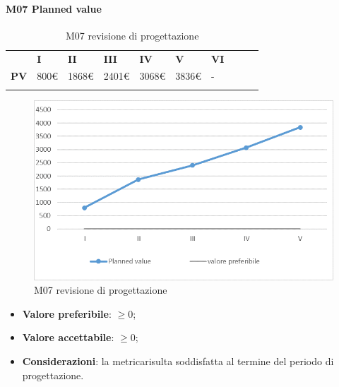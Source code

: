 \paragraph{M07 Planned value} \mbox{}
\begin{longtable}[H!] {						
		>{}p{38mm}  		
		>{}p{12mm}
		>{}p{12mm}		
		>{}p{12mm}		
		>{}p{12mm}		
		>{}p{12mm}		
		>{}p{12mm}
		>{}p{12mm}
		>{}p{12mm}
		>{}p{12mm}
	}
	\rowcolor{gray!50}
	\textbf{} & \textbf{I} & \textbf{II} & \textbf{III} & \textbf{IV} & \textbf{V} & \textbf{VI} \TBstrut \\ [2mm]
	\textbf{PV} & 800\euro & 1868\euro & 2401\euro & 3068\euro & 3836\euro & - \TBstrut \\ [2mm]
	\rowcolor{white}
	\caption{M07 revisione di progettazione\glo}
\end{longtable}
\begin{figure}[H] 	
\includegraphics[width=\linewidth]{./img/grafici/RP4.png}	
\caption{M07 revisione di progettazione\glo}	
\end{figure}
\begin{itemize}
	\item \textbf{Valore preferibile}: $\ge0$;
	\item \textbf{Valore accettabile}: $\ge0$;
	\item \textbf{Considerazioni}: la metrica\glosp risulta soddisfatta al termine del periodo di progettazione\glo.
\end{itemize}
